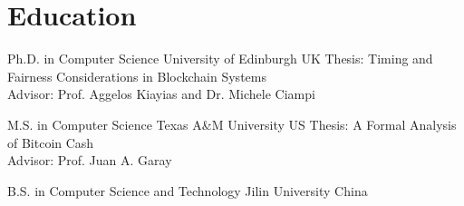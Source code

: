 \section{Education}

{Ph.D. in Computer Science}
{University of Edinburgh}
{UK}
{}
{Thesis: Timing and Fairness Considerations in Blockchain Systems\\Advisor: Prof. Aggelos Kiayias and Dr. Michele Ciampi}

{M.S. in Computer Science}
{Texas A\&M University}
{}
{US}
{Thesis: A Formal Analysis of Bitcoin Cash \\Advisor: Prof. Juan A. Garay}

{B.S. in Computer Science and Technology}
{Jilin University}
{}
{China}
{}
